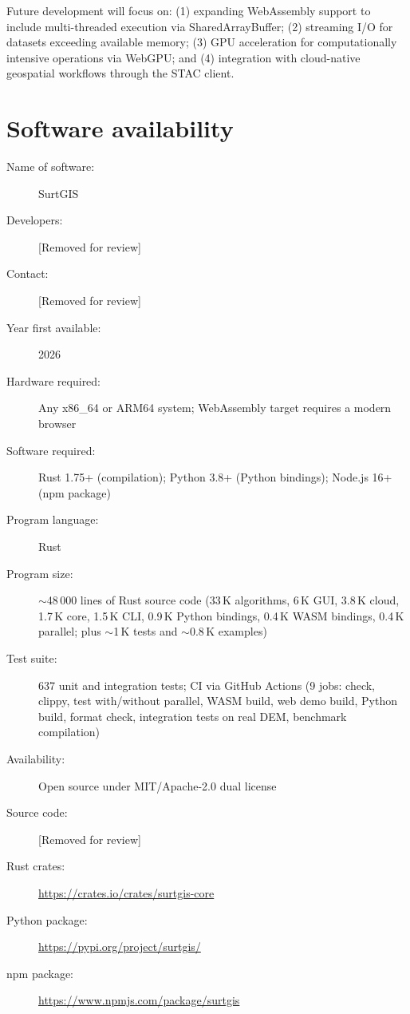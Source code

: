 \documentclass[preprint,review,12pt,authoryear]{elsarticle}
\begin{document}
Future development will focus on: (1) expanding WebAssembly support to include multi-threaded execution via SharedArrayBuffer; (2) streaming I/O for datasets exceeding available memory; (3) GPU acceleration for computationally intensive operations via WebGPU; and (4) integration with cloud-native geospatial workflows through the STAC client.

\section*{Software availability}

\begin{description}
    \item[Name of software:] SurtGIS
    \item[Developers:] [Removed for review]
    \item[Contact:] [Removed for review]
    \item[Year first available:] 2026
    \item[Hardware required:] Any x86\_64 or ARM64 system; WebAssembly target requires a modern browser
    \item[Software required:] Rust 1.75+ (compilation); Python 3.8+ (Python bindings); Node.js 16+ (npm package)
    \item[Program language:] Rust
    \item[Program size:] $\sim$48\,000 lines of Rust source code (33\,K algorithms, 6\,K GUI, 3.8\,K cloud, 1.7\,K core, 1.5\,K CLI, 0.9\,K Python bindings, 0.4\,K WASM bindings, 0.4\,K parallel; plus $\sim$1\,K tests and $\sim$0.8\,K examples)
    \item[Test suite:] 637 unit and integration tests; CI via GitHub Actions (9 jobs: check, clippy, test with/without parallel, WASM build, web demo build, Python build, format check, integration tests on real DEM, benchmark compilation)
    \item[Availability:] Open source under MIT/Apache-2.0 dual license
    \item[Source code:] [Removed for review]
    \item[Rust crates:] \url{https://crates.io/crates/surtgis-core}
    \item[Python package:] \url{https://pypi.org/project/surtgis/}
    \item[npm package:] \url{https://www.npmjs.com/package/surtgis}
\end{description}
\end{document}
